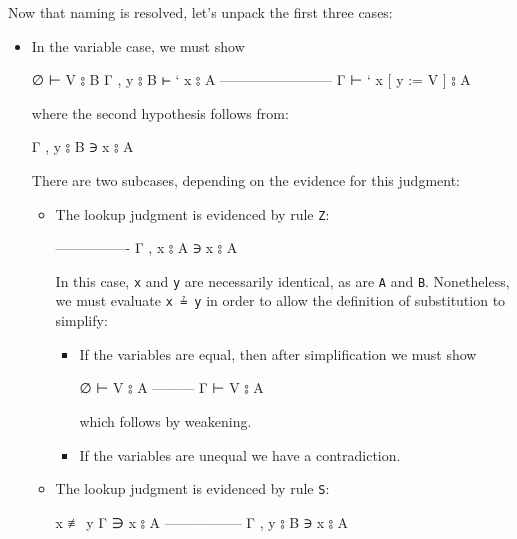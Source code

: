 Now that naming is resolved, let's unpack the first three cases:

\begin{itemize}
\item
  In the variable case, we must show

  \begin{myDisplay}
  ∅ ⊢ V ⦂ B
  Γ , y ⦂ B ⊢ ` x ⦂ A
  ------------------------
  Γ ⊢ ` x [ y := V ] ⦂ A
  \end{myDisplay}

  where the second hypothesis follows from:

  \begin{myDisplay}
  Γ , y ⦂ B ∋ x ⦂ A
  \end{myDisplay}

  There are two subcases, depending on the evidence for this judgment:

  \begin{itemize}
  \item
    The lookup judgment is evidenced by rule \texttt{Z}:

    \begin{myDisplay}
    ----------------
    Γ , x ⦂ A ∋ x ⦂ A
    \end{myDisplay}

    In this case, \texttt{x} and \texttt{y} are necessarily identical,
    as are \texttt{A} and \texttt{B}. Nonetheless, we must evaluate
    \texttt{x\ ≟\ y} in order to allow the definition of substitution to
    simplify:

    \begin{itemize}
    \item
      If the variables are equal, then after simplification we must show

      \begin{myDisplay}
      ∅ ⊢ V ⦂ A
      ---------
      Γ ⊢ V ⦂ A
      \end{myDisplay}

      which follows by weakening.
    \item
      If the variables are unequal we have a contradiction.
    \end{itemize}
  \item
    The lookup judgment is evidenced by rule \texttt{S}:

    \begin{myDisplay}
    x ≢ y
    Γ ∋ x ⦂ A
    -----------------
    Γ , y ⦂ B ∋ x ⦂ A
    \end{myDisplay}


\end{itemize}
\end{itemize}
